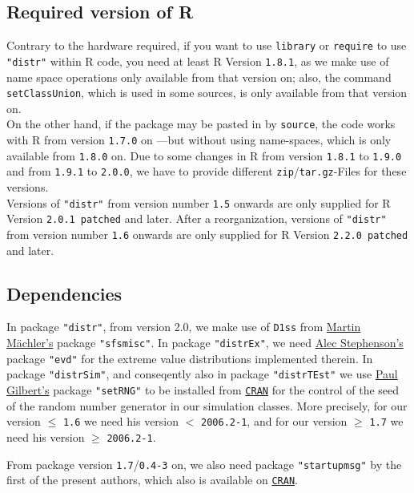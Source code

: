 \documentclass[11pt]{article}
\newcommand{\code}[1]{{\tt #1}}
\newcommand{\pkg}[1]{{\tt "#1"}}
\begin{document}
\subsection{Required version of {\sf R}}
Contrary to the hardware required,
if you want to use \code{library} or \code{require} to use  \pkg{distr}
within {\sf R} code, you need at least {\sf R} Version {\tt 1.8.1},
as we make use of name space operations only available from that version on;
also, the command \code{setClassUnion}, which is used in some sources, is only
 available from that version on.\\
%
On the other hand, if the package may be pasted in by \code{source}, the code
works with {\sf R} from
version {\tt 1.7.0} on ---but without using name-spaces, which is only available
 from {\tt 1.8.0} on.
Due to some changes in {\sf R} from version {\tt 1.8.1} to {\tt 1.9.0} and from
{\tt 1.9.1} to {\tt 2.0.0}, we have to provide different
 {\tt zip}/{\tt tar.gz}-Files for these versions.\\
Versions of \pkg{distr} from version number {\tt 1.5} onwards are only
supplied for {\sf R} Version {\tt 2.0.1 patched} and later.
After a reorganization, versions of \pkg{distr} from version number {\tt 1.6}
onwards are only supplied for {\sf R} Version {\tt 2.2.0 patched} and later.


\subsection{Dependencies}
In package \pkg{distr}, from version 2.0, we make use of \code{D1ss} from
\href{mailto:maechler@stat.math.ethz.ch}{Martin M\"achler's} package \pkg{sfsmisc}.
In package \pkg{distrEx}, we need
\href{mailto:alec_stephenson@hotmail.com}{Alec Stephenson's} package \pkg{evd}
for the extreme  value distributions implemented therein.
In package \pkg{distrSim}, and conseqently also in package \pkg{distrTEst} we
use \href{mailto:pgilbert@bank-banque-canada.ca}{Paul Gilbert's}
package \pkg{setRNG}
to be installed from \href{http://cran.r-project.org/mirrors.html}{\tt CRAN}
for the control of the seed of the random number generator in our simulation
classes.
More precisely, for our version $\le$ {\tt 1.6}  we need his
 version $<$ {\tt 2006.2-1},
and for our version $\ge$ {\tt 1.7} we need his version $\ge$ {\tt 2006.2-1}.

From package version {\tt 1.7}/{\tt 0.4-3} on, we also need package
 \pkg{startupmsg} by the first of the present authors, which also is available
 on \href{http://cran.r-project.org/mirrors.html}{\tt CRAN}.
\end{document}
